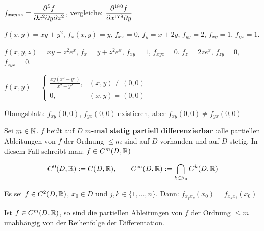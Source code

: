 \documentclass[a4paper,oneside,DIV15,BCOR12mm,chapterprefix=true,headings=onelinechapter]{scrbook}
\begin{document}
\begin{schreibweisen}
$\displaystyle f_{xxyzz} = \frac{\partial^5 f}{\partial x^2\partial y\partial z^2}$, vergleiche: $\displaystyle\frac{\partial^{180} f}{\partial x^{179}\partial y}$
\end{schreibweisen}

\begin{beispiele}
\item $f(x,y) = xy + y^2$, $f_x(x,y)=y$, $f_{xx} = 0$, $f_y = x + 2y$, $f_{yy} = 2$, $f_{xy}=1$, $f_{yx} = 1$.
\item $f(x,y,z) = xy + z^2e^x$, $f_x = y+z^2e^x$, $f_{xy} = 1$, $f_{xyz} = 0$. $f_z=2ze^x$, $f_{zy}=0$, $f_{zyx} = 0$.
\item $f(x,y) = \begin{cases} \frac{xy(x^2-y^2)}{x^2+y^2}, & (x,y) \ne (0,0) \\ 0, &(x,y)=(0,0)\end{cases}$

Übungsblatt: $f_{xy}(0,0)$, $f_{yx}(0,0)$ existieren, aber $f_{xy}(0,0) \ne f_{yx}(0,0)$
\end{beispiele}

\begin{definition}
Sei $m\in\mathbb{N}$. $f$ heißt auf $D$ \textbf{$m$-mal stetig partiell differenzierbar} :\equizu alle partiellen Ableitungen  von $f$ der Ordnung $\le m$ sind auf $D$ vorhanden und auf $D$ stetig. In diesem Fall schreibt man: $f\in C^m(D,\mathbb{R})$

$$C^0(D, \mathbb{R}) := C(D,\mathbb{R}),\qquad C^\infty(D,\mathbb{R}) := \bigcap_{k\in\mathbb{N}_0}C^{k}(D,\mathbb{R})$$
\end{definition}

\begin{satz}
Es sei $f\in C^2(D,\mathbb{R})$, $x_0\in D$ und $j,k\in\{1,\ldots,n\}$. Dann: $f_{x_jx_k}(x_0) = f_{x_kx_j}(x_0)$
\end{satz}

\begin{satz}[Folgerung]
Ist $f\in C^m(D,\mathbb{R})$, so sind die partiellen Ableitungen von $f$ der Ordnung $\le m$ unabhängig von der Reihenfolge der Differentation.
\end{satz}
\end{document}
